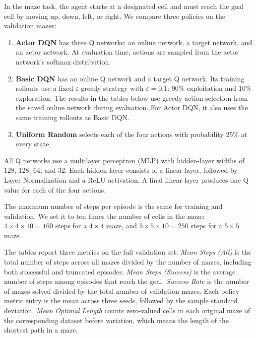 \documentclass[a4paper,12pt]{article}
\begin{document}
In the maze task, the agent starts at a designated cell and must reach the goal cell by moving up, down, left, or right. We compare three policies on the validation mazes:
\begin{enumerate}
    \item \textbf{Actor DQN} has three Q networks: an online network, a target network, and an actor network. At evaluation time, actions are sampled from the actor network's softmax distribution.
    \item \textbf{Basic DQN} has an online Q network and a target Q network. Its training rollouts use a fixed $\varepsilon$-greedy strategy with $\varepsilon=0.1$: 90\% exploitation and 10\% exploration. The results in the tables below use greedy action selection from the saved online network during evaluation. For Actor DQN, it also uses the same training rollouts as Basic DQN.
    \item \textbf{Uniform Random} selects each of the four actions with probability 25\% at every state.
\end{enumerate}


All Q networks use a multilayer perceptron (MLP) with hidden-layer widths of 128, 128, 64, and 32. Each hidden layer consists of a linear layer, followed by Layer Normalization and a ReLU activation. A final linear layer produces one Q value for each of the four actions.

The maximum number of steps per episode is the same for training and validation. We set it to ten times the number of cells in the maze: $4\times4\times10=160$ steps for a $4\times4$ maze, and $5\times5\times10=250$ steps for a $5\times5$ maze.


The tables report three metrics on the full validation set. \emph{Mean Steps (All)} is the total number of steps across all mazes divided by the number of mazes, including both successful and truncated episodes. \emph{Mean Steps (Success)} is the average number of steps among episodes that reach the goal. \emph{Success Rate} is the number of mazes solved divided by the total number of validation mazes. Each policy metric entry is the mean across three seeds, followed by the sample standard deviation. \emph{Mean Optimal Length} counts zero-valued cells in each original maze of the corresponding dataset before variation, which means the length of the shortest path in a maze.
\end{document}

